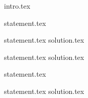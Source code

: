 

{intro.tex}

{statement.tex}

{statement.tex}
{solution.tex}

{statement.tex}
{solution.tex}

{statement.tex}

{statement.tex}
{solution.tex}
